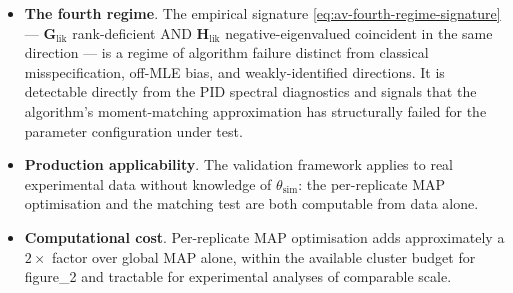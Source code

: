 \documentclass[11pt]{article}
\begin{document}
\begin{itemize}
  exhibits a categorical departure from macro\_IR on the same data:
  $\lambda_{\min}(\mathbf H_{\mathrm{lik}}) \approx -42$ in 100/100
  replicates, coincident with $\mathrm{rank}(\mathbf G_{\mathrm{lik}}) < p$
  in the same direction. macro\_IR shows no such pattern at any $\Delta t$.
\item \textbf{The fourth regime}. The empirical signature
  \eqref{eq:av-fourth-regime-signature} ---
  $\mathbf G_{\mathrm{lik}}$ rank-deficient AND
  $\mathbf H_{\mathrm{lik}}$ negative-eigenvalued coincident in the
  same direction --- is a regime of algorithm failure distinct from
  classical misspecification, off-MLE bias, and weakly-identified
  directions. It is detectable directly from the PID spectral
  diagnostics and signals that the algorithm's moment-matching
  approximation has structurally failed for the parameter
  configuration under test.
\item \textbf{Production applicability}. The validation framework
  applies to real experimental data without knowledge of
  $\theta_{\mathrm{sim}}$: the per-replicate MAP optimisation and the
  matching test are both computable from data alone.
\item \textbf{Computational cost}. Per-replicate MAP optimisation
  adds approximately a $2\times$ factor over global MAP alone, within
  the available cluster budget for figure\_2 and tractable for
  experimental analyses of comparable scale.
\end{itemize}
\end{document}

